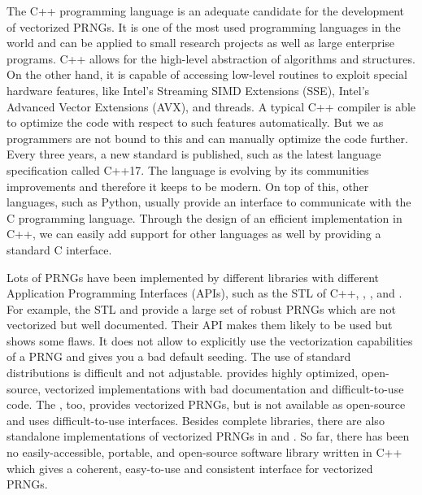 \documentclass{stdlocal}
\begin{document}
The C++ programming language is an adequate candidate for the development of vectorized PRNGs.
It is one of the most used programming languages in the world and can be applied to small research projects as well as large enterprise programs.
C++ allows for the high-level abstraction of algorithms and structures.
On the other hand, it is capable of accessing low-level routines to exploit special hardware features, like Intel's Streaming SIMD Extensions (SSE), Intel's Advanced Vector Extensions (AVX), and threads.
A typical C++ compiler is able to optimize the code with respect to such features automatically.
But we as programmers are not bound to this and can manually optimize the code further.
Every three years, a new standard is published, such as the latest language specification called C++17.
The language is evolving by its communities improvements and therefore it keeps to be modern.
On top of this, other languages, such as Python, usually provide an interface to communicate with the C programming language.
Through the design of an efficient implementation in C++, we can easily add support for other languages as well by providing a standard C interface.
\autocite{stroustrup2014,meyers2014,vandevoorde2018,intel-intrinsics-guide,reddy2011,cppreference,isocpp}

Lots of PRNGs have been implemented by different libraries with different Application Programming Interfaces (APIs), such as the STL of C++, , , and .
For example, the STL and  provide a large set of robust PRNGs which are not vectorized but well documented.
Their API makes them likely to be used but shows some flaws.
It does not allow to explicitly use the vectorization capabilities of a PRNG and gives you a bad default seeding.
The use of standard distributions is difficult and not adjustable.
 provides highly optimized, open-source, vectorized implementations with bad documentation and difficult-to-use code.
The , too, provides vectorized PRNGs, but is not available as open-source and uses difficult-to-use interfaces.
Besides complete libraries, there are also standalone implementations of vectorized PRNGs in \textcite{lemire-pcg} and \textcite{lemire-xorshift}.
So far, there has been no easily-accessible, portable, and open-source software library written in C++ which gives a coherent, easy-to-use and consistent interface for vectorized PRNGs.
\autocite{intel-mkl,boost,guskova2016,oneill-blog-api,gcc-libstdcpp}
\end{document}
